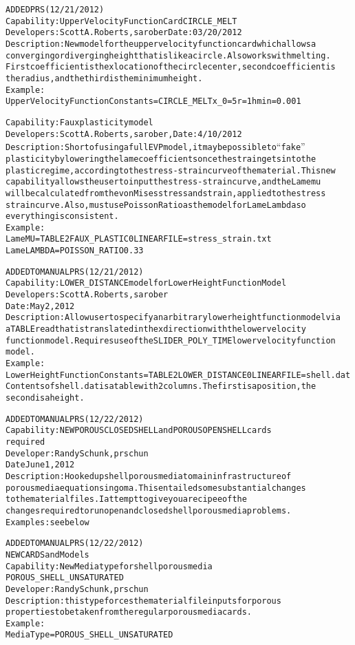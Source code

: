 \documentclass{article}
\begin{document}
\begin{alltt}
ADDED PRS (12/21/2012)
Capability: Upper Velocity Function Card CIRCLE_MELT
Developers: Scott A. Roberts, sarober Date: 03/20/2012
Description: New model for the upper velocity function card which allows a
converging or diverging height that is like a circle.  Also works with melting. 
First coefficient is the x location of the circle center, second coefficient is
the radius, and the third is the minimum height. 
Example: 
Upper Velocity Function Constants = CIRCLE_MELT {x_0=5} {r=1} {hmin=0.001}  

Capability:  Faux plasticity model
Developers:  Scott A. Roberts, sarober, Date:  4/10/2012
Description:  Short of using a full EVP model, it may be possible to ``fake'' 
plasticity by lowering the lame coefficients once the strain gets into the
plastic regime, according to the stress-strain curve of the material.  This new
capability allows the user to input the stress-strain curve, and the Lame mu 
will be calculated from the von Mises stress and strain, applied to the stress 
strain curve.  Also, must use Poisson Ratio as the model for Lame Lambda so
everything is consistent.
Example:
Lame MU       = TABLE 2 FAUX_PLASTIC 0 LINEAR FILE=stress_strain.txt
Lame LAMBDA   = POISSON_RATIO 0.33

ADDED TO MANUAL PRS (12/21/2012)
Capability:  LOWER_DISTANCE model for Lower Height Function Model
Developers:  Scott A. Roberts, sarober
Date:  May 2, 2012
Description:  Allow user to specify an arbitrary lower height function model via
a TABLE read that is translated in the x direction with the lower velocity 
function model.  Requires use of the SLIDER_POLY_TIME lower velocity function 
model.
Example:
Lower Height Function Constants   = TABLE 2 LOWER_DISTANCE 0 LINEAR FILE=shell.dat
Contents of shell.dat is a table with 2 columns.  The first is a position, the 
second is a height.

ADDED TO MANUAL PRS (12/22/2012)
Capability:  NEW POROUS CLOSED SHELL and POROUS OPEN SHELL cards
required
Developer: Randy Schunk, prschun
Date June 1, 2012
Description: Hooked up shell porous media to main infrastructure of
porous media equations in goma. This entailed some substantial changes
to the material files.    I attempt to give you a recipee of the
changes required to run open and closed shell porous media problems.
Examples: see below

ADDED TO MANUAL PRS (12/22/2012)
NEW CARDS and Models
Capability: New Media type for shell porous media
POROUS_SHELL_UNSATURATED
Developer: Randy Schunk, prschun
Description: this type forces the material file inputs for porous
properties to be taken from the regular porous media cards. 
Example:
Media Type	 	           = POROUS_SHELL_UNSATURATED


\end{alltt}
\end{document}
